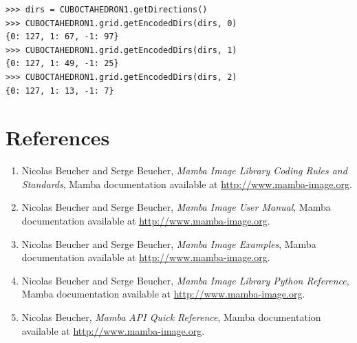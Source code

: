 \documentclass[a4paper,10pt,oneside]{article}
\begin{document}
\lstset{language=Python}
\begin{lstlisting}
>>> dirs = CUBOCTAHEDRON1.getDirections()
>>> CUBOCTAHEDRON1.grid.getEncodedDirs(dirs, 0)
{0: 127, 1: 67, -1: 97}
>>> CUBOCTAHEDRON1.grid.getEncodedDirs(dirs, 1)
{0: 127, 1: 49, -1: 25}
>>> CUBOCTAHEDRON1.grid.getEncodedDirs(dirs, 2)
{0: 127, 1: 13, -1: 7}
\end{lstlisting}

\section{References}
\begin{enumerate}
\setcounter{enumi}{0}
\item \label{art:MILCRSman} Nicolas Beucher and Serge Beucher,
\emph{Mamba Image Library Coding Rules and Standards},
Mamba documentation available at \url{http://www.mamba-image.org}.
\item \label{art:MIUman} Nicolas Beucher and Serge Beucher,
\emph{Mamba Image User Manual},
Mamba documentation available at \url{http://www.mamba-image.org}.
\item \label{art:MIEman} Nicolas Beucher and Serge Beucher,
\emph{Mamba Image Examples},
Mamba documentation available at \url{http://www.mamba-image.org}.
\item \label{art:MILPRman} Nicolas Beucher and Serge Beucher,
\emph{Mamba Image Library Python Reference},
Mamba documentation available at \url{http://www.mamba-image.org}.
\item \label{art:MQRman} Nicolas Beucher,
\emph{Mamba API Quick Reference},
Mamba documentation available at \url{http://www.mamba-image.org}.
\end{enumerate}
\end{document}
